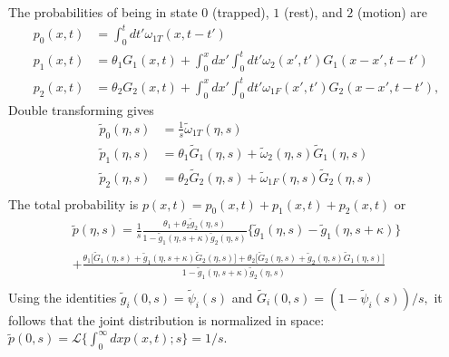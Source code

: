 \documentclass[]{agujournal2018}
\newcommand\tom{\tilde{\omega}}
\newcommand\tg{\tilde{g}}
\newcommand\tp{\tilde{p}}
\newcommand\tG{\tilde{G}}
\begin{document}
The probabilities of being in state $0$ (trapped), $1$ (rest), and $2$ (motion) are
\begin{align}
p_0(x,t) &= \int_0^t dt' \omega_{1T}(x,t-t')\\
p_1(x,t) &= \theta_1 G_1(x,t) + \int_0^x dx' \int_0^t dt' \omega_2(x',t')G_1(x-x',t-t')\\
p_2(x,t) &= \theta_2 G_2(x,t) + \int_0^x dx' \int_0^t dt' \omega_{1F}(x',t')G_2(x-x',t-t'),
\end{align}
Double transforming gives
\begin{align}
\tp_0(\eta,s) &= \frac{1}{s}\tom_{1T}(\eta,s)\\
\tp_1(\eta,s) &= \theta_1 \tG_1(\eta,s) + \tom_2(\eta,s) \tG_1(\eta,s) \\
\tp_2(\eta,s) &= \theta_2 \tG_2(\eta,s) + \tom_{1F}(\eta,s)\tG_2(\eta,s)\\
\end{align}
The total probability is $p(x,t) = p_0(x,t) + p_1(x,t) + p_2(x,t)$ or 
\begin{multline}
\tp(\eta,s) = \frac{1}{s}\frac{\theta_1 + \theta_2 \tg_2(\eta,s)}{1-\tg_1(\eta,s+\kappa)\tg_2(\eta,s)}\big\{\tg_1(\eta,s)-\tg_1(\eta,s+\kappa) \big\} \\
+\frac{\theta_1\big[\tG_1(\eta,s) + \tg_1(\eta,s+\kappa)\tG_2(\eta,s)\big]+ \theta_2\big[\tG_2(\eta,s) + \tg_2(\eta,s)\tG_1(\eta,s)\big]}{1-\tg_1(\eta,s+\kappa)\tg_2(\eta,s)} \\
\end{multline}
Using the identities $\tg_i(0,s) = \tilde{\psi}_i(s)$ and $\tG_i(0,s) = (1-\tilde{\psi}_i(s))/s,$ it follows that the joint distribution is normalized in space: $\tp(0,s) = \mathcal{L}\{\int_0^\infty dx p(x,t);s\} = 1/s$.
\end{document}
